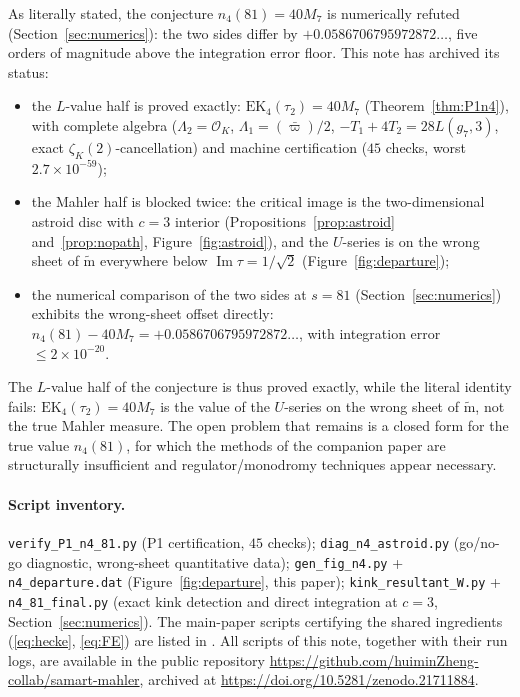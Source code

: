 \documentclass[11pt]{article}
\theoremstyle{definition}
\theoremstyle{remark}
\newcommand{\cL}{\Lambda}
\newcommand{\ImT}{\operatorname{Im}}
\newcommand{\OO}{\mathcal{O}}
\newcommand{\m}{\mathrm{m}}
\newcommand{\mt}{\widetilde{\m}}
\begin{document}
As literally stated, the conjecture $n_4(81)=40M_7$ is numerically
refuted (Section~\ref{sec:numerics}): the two sides differ by
$+0.0586706795972872\ldots$, five orders of magnitude above the
integration error floor. This note has archived its status:

\begin{itemize}
\item the $L$-value half is proved exactly:
$\mathrm{EK}_4(\tau_2)=40M_7$ (Theorem~\ref{thm:P1n4}), with complete
algebra ($\cL_2=\OO_K$, $\cL_1=(\bar\varpi)/2$,
$-T_1+4T_2=28L(g_7,3)$, exact $\zeta_K(2)$-cancellation) and machine
certification ($45$ checks, worst $2.7\times10^{-59}$);
\item the Mahler half is blocked twice: the critical image is the
two-dimensional astroid disc with $c=3$ interior
(Propositions~\ref{prop:astroid} and~\ref{prop:nopath},
Figure~\ref{fig:astroid}), and the $U$-series is on the wrong sheet of
$\mt$ everywhere below $\ImT\tau=1/\sqrt2$
(Figure~\ref{fig:departure});
\item the numerical comparison of the two sides at $s=81$
(Section~\ref{sec:numerics}) exhibits the wrong-sheet offset directly:
$n_4(81)-40M_7=+0.0586706795972872\ldots$, with integration error
$\le 2\times10^{-20}$.
\end{itemize}

The $L$-value half of the conjecture is thus proved exactly, while the
literal identity fails: $\mathrm{EK}_4(\tau_2)=40M_7$ is the value of
the $U$-series on the wrong sheet of $\mt$, not the true Mahler
measure. The open problem that remains is a closed form for the true
value $n_4(81)$, for which the methods of the companion paper
\cite{Zf} are structurally insufficient and regulator/monodromy
techniques \cite{HY,ZGQ} appear necessary.

\paragraph{Script inventory.}
\texttt{verify\_P1\_n4\_81.py} (P1 certification, $45$ checks);
\texttt{diag\_n4\_astroid.py} (go/no-go diagnostic, wrong-sheet
quantitative data); \texttt{gen\_fig\_n4.py} +
\texttt{n4\_departure.dat} (Figure~\ref{fig:departure}, this paper);
\texttt{kink\_resultant\_W.py} + \texttt{n4\_81\_final.py} (exact kink
detection and direct integration at $c=3$,
Section~\ref{sec:numerics}).
The main-paper scripts certifying the shared ingredients
(\eqref{eq:hecke}, \eqref{eq:FE}) are listed in \cite[\S6]{Zf}.
All scripts of this note, together with their run logs, are available
in the public repository
\url{https://github.com/huiminZheng-collab/samart-mahler}, archived at
\url{https://doi.org/10.5281/zenodo.21711884}.
\end{document}
